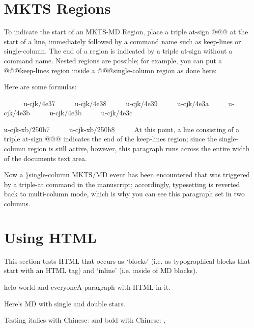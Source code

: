 \section{MKTS Regions 
}
\begin{multicols}{2}To indicate the start of an MKTS-MD Region, place a triple at-sign {\mktsStyleCode{}@@@}
at the start of a line, immediately followed by a command name such as
{\mktsStyleCode{}keep-lines} or {\mktsStyleCode{}single-column}. The end of a region is indicated by a
triple at-sign without a command name. Nested regions are possible; for example,
you can put a {\mktsStyleCode{}@@@keep-lines} region inside a {\mktsStyleCode{}@@@single-column} region as
done here:\mktsShowpar\par
\end{multicols}Here are some formulas:
\mktsShowpar\par
\begingroup{}     
{\mktsStyleCode{}u-cjk/4e37}     
{\mktsStyleCode{}u-cjk/4e38}     
{\mktsStyleCode{}u-cjk/4e39}     
{\mktsStyleCode{}u-cjk/4e3a}     
{\mktsStyleCode{}u-cjk/4e3b}     
{\mktsStyleCode{}u-cjk/4e3b}     
{\mktsStyleCode{}u-cjk/4e3c}     

{\mktsStyleCode{}u-cjk-xb/250b7}     
{\mktsStyleCode{}u-cjk-xb/250b8}     
\endgroup{}At this point, a line consisting of a triple at-sign {\mktsStyleCode{}@@@}
indicates the end of the {\mktsStyleCode{}keep-lines} region; since the
{\mktsStyleCode{}single-column} region is still active, however, {\mktsStyleItalic{}this
paragraph runs across the entire width} of the documents text
area.
\begin{multicols}{2}Now a {\mktsStyleCode{}\}single-column} MKTS/MD event has been encountered
that was triggered by a triple-at command in the manuscript;
accordingly, typesetting is reverted back to multi-column mode,
which is why you can see this paragraph set in two columns.\mktsShowpar\par
\end{multicols}
\section{Using HTML
}
\begin{multicols}{2}This section tests HTML that occurs as ‘blocks’ (i.e. as typographical blocks
that start with an HTML tag) and ‘inline’ (i.e. inside of MD blocks).\mktsShowpar\par
helo {\mktsStyleItalic{}world} and {\mktsStyleBold{}everyone}A paragraph with {} HTML in it.\mktsShowpar\par
Here’s MD with {\mktsStyleItalic{}single} and {\mktsStyleBold{}double} stars.\mktsShowpar\par
Testing {\mktsStyleItalic{}italics with Chinese: } and {\mktsStyleBold{}bold with Chinese: , }\end{multicols}

